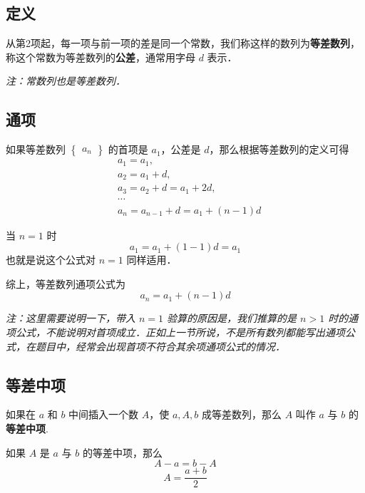 
\subsection{定义}
从第2项起，每一项与前一项的差是同一个常数，我们称这样的数列为\textbf{等差数列}，称这个常数为等差数列的\textbf{公差}，通常用字母 $d$ 表示．

\textsl{注：常数列也是等差数列．}

\subsection{通项}
如果等差数列 $\begin{Bmatrix} a_n \end{Bmatrix}$ 的首项是 $a_1$，公差是 $d$，那么根据等差数列的定义可得
\begin{equation}
\begin{aligned}
&a_1 = a_1,\\
&a_2 = a_1 + d,\\
&a_3 = a_2 + d = a_1 + 2d,\\
&\cdots \\
&a_n = a_{n-1} + d = a_1 + (n - 1)d
\end{aligned}
\end{equation}

当 $n = 1$ 时
\begin{equation}
a_1 = a_1 + (1 - 1)d = a_1
\end{equation}
也就是说这个公式对 $n = 1$ 同样适用．

综上，等差数列通项公式为
\begin{equation}
a_n = a_1 + (n - 1)d
\end{equation}

\textsl{注：这里需要说明一下，带入 $n = 1$ 验算的原因是，我们推算的是 $n > 1$ 时的通项公式，不能说明对首项成立．正如上一节所说，不是所有数列都能写出通项公式，在题目中，经常会出现首项不符合其余项通项公式的情况．}

\subsection{等差中项}
如果在 $a$ 和 $b$ 中间插入一个数 $A$，使 $a,A,b$ 成等差数列，那么 $A$ 叫作 $a$ 与 $b$ 的\textbf{等差中项}.

如果 $A$ 是 $a$ 与 $b$ 的等差中项，那么
\begin{equation}
A - a = b - A
\end{equation}
\begin{equation}
A = \frac{a+b}{2}
\end{equation}

